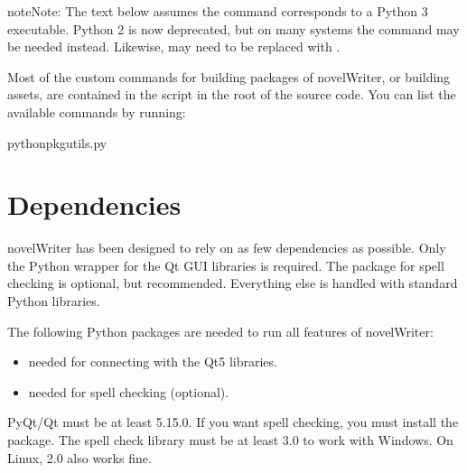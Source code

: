 \documentclass[a4paper,11pt,english]{sphinxmanual}
\begin{document}
\begin{sphinxadmonition}{note}{Note:}
\sphinxAtStartPar
The text below assumes the command  corresponds to a Python 3 executable. Python 2 is
now deprecated, but on many systems the command  may be needed instead. Likewise,
 may need to be replaced with .
\end{sphinxadmonition}

\sphinxAtStartPar
Most of the custom commands for building packages of novelWriter, or building assets, are contained
in the  script in the root of the source code. You can list the available commands
by running:

\begin{sphinxVerbatim}[commandchars=\\\{\}]
pythonpkgutils.py
\end{sphinxVerbatim}


\section{Dependencies}
\label{\detokenize{tech_source:dependencies}}\label{\detokenize{tech_source:a-source-depend}}
\sphinxAtStartPar
novelWriter has been designed to rely on as few dependencies as possible. Only the Python wrapper
for the Qt GUI libraries is required. The package for spell checking is optional, but recommended.
Everything else is handled with standard Python libraries.

\sphinxAtStartPar
The following Python packages are needed to run all features of novelWriter:
\begin{itemize}
\item {} 
\sphinxAtStartPar
{} \textendash{} needed for connecting with the Qt5 libraries.

\item {} 
\sphinxAtStartPar
{} \textendash{} needed for spell checking (optional).

\end{itemize}

\sphinxAtStartPar
PyQt/Qt must be at least 5.15.0. If you want spell checking, you must install the 
package. The spell check library must be at least 3.0 to work with Windows. On Linux, 2.0 also
works fine.
\end{document}
